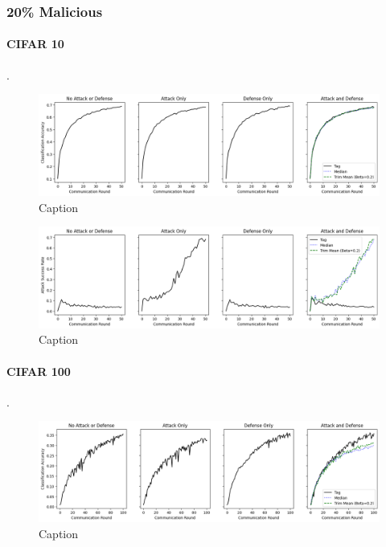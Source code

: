 \documentclass{article} %
\begin{document}
%
\pagebreak
\subsubsection{20\% Malicious}


%
\paragraph{CIFAR 10}.

\begin{figure}[H]
    \centering
    \includegraphics[width=\textwidth]{cifar_10/neuro/tag/distributed/alpha10000--alpha_val10000/visuals/clean_accuracy--n_malicious2--beta0.2.png}
    \caption{Caption}
    \label{fig:my_label}
\end{figure}

\begin{figure}[H]
    \centering
    \includegraphics[width=\textwidth]{cifar_10/neuro/tag/distributed/alpha10000--alpha_val10000/visuals/pois_accuracy--n_malicious2--beta0.2.png}
    \caption{Caption}
    \label{fig:my_label}
\end{figure}


%
\paragraph{CIFAR 100}.

\begin{figure}[H]
    \centering
    \includegraphics[width=\textwidth]{cifar_100/neuro/tag/distributed/alpha10000--alpha_val10000/visuals/clean_accuracy--n_malicious2--beta0.2.png}
    \caption{Caption}
    \label{fig:my_label}
\end{figure}
\end{document}

